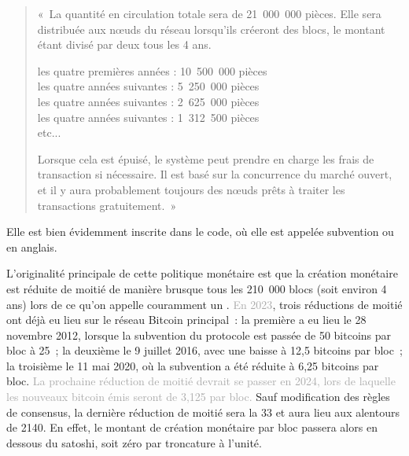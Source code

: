 \begin{quote}
«~La quantité en circulation totale sera de 21~000~000 pièces. Elle sera distribuée aux nœuds du réseau lorsqu'ils créeront des blocs, le montant étant divisé par deux tous les 4 ans.

les quatre premières années : 10~500~000 pièces\\
les quatre années suivantes : 5~250~000 pièces\\
les quatre années suivantes : 2~625~000 pièces\\
les quatre années suivantes : 1~312~500 pièces\\
etc...

Lorsque cela est épuisé, le système peut prendre en charge les frais de transaction si nécessaire. Il est basé sur la concurrence du marché ouvert, et il y aura probablement toujours des nœuds prêts à traiter les transactions gratuitement.~»
\end{quote}

Elle est bien évidemment inscrite dans le code, où elle est appelée subvention ou  en anglais.

L'originalité principale de cette politique monétaire est que la création monétaire est réduite de moitié de manière brusque tous les 210~000 blocs (soit environ 4 ans) lors de ce qu'on appelle couramment un . \textcolor{darkgray}{En 2023}, trois réductions de moitié ont déjà eu lieu sur le réseau Bitcoin principal~: la première a eu lieu le 28 novembre 2012, lorsque la subvention du protocole est passée de 50 bitcoins par bloc à 25~; la deuxième le 9 juillet 2016, avec une baisse à 12,5 bitcoins par bloc~; la troisième le 11 mai 2020, où la subvention a été réduite à 6,25 bitcoins par bloc. \textcolor{darkgray}{La prochaine réduction de moitié devrait se passer en 2024, lors de laquelle les nouveaux bitcoin émis seront de 3,125 par bloc.} Sauf modification des règles de consensus, la dernière réduction de moitié sera la 33\ieme{} et aura lieu aux alentours de 2140. En effet, le montant de création monétaire par bloc passera alors en dessous du satoshi, soit zéro par troncature à l'unité.

%
% 
% 


